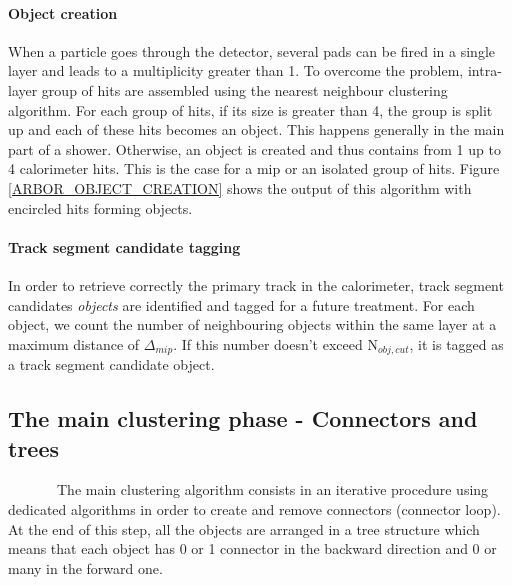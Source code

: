 \documentclass[cits]{JINST}
\begin{document}
\paragraph*{Object creation} When a particle goes through the detector, several pads can be fired in a single layer and leads to a multiplicity greater than 1. To overcome the problem, intra-layer group of hits are assembled using the nearest neighbour clustering algorithm. For each group of hits, if its size is greater than 4, the group is split up and each of these hits becomes an object. This happens generally in the main part of a shower. Otherwise, an object is created and thus contains from 1 up to 4 calorimeter hits. This is the case for a mip or an isolated group of hits. Figure \ref{ARBOR_OBJECT_CREATION} shows the output of this algorithm with encircled hits forming objects.

\paragraph*{Track segment candidate tagging}
In order to retrieve correctly the primary track in the calorimeter, track segment candidates \textit{objects} are identified and tagged for a future treatment.
For each object, we count the number of neighbouring objects within the same layer at a maximum distance of $\Delta_{mip}$. If this number doesn't exceed N$_{obj,cut}$, it is tagged as a track segment candidate object.

\subsection{The main clustering phase - Connectors and trees}

~~~~~~~The main clustering algorithm consists in an iterative procedure using dedicated algorithms in order to create and remove connectors (connector loop). At the end of this step, all the objects are arranged in a tree structure which means that each object has 0 or 1 connector in the backward direction and 0 or many in the forward one.
\end{document}
